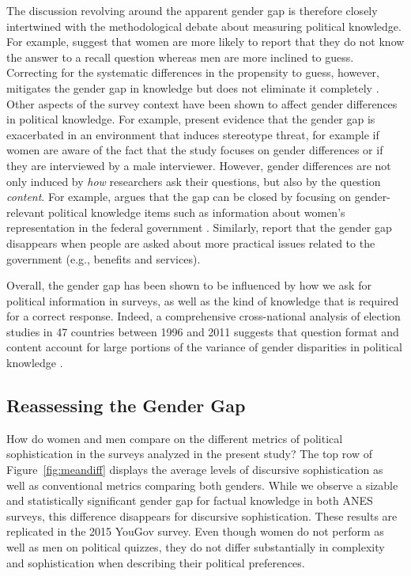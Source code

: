The discussion revolving around the apparent gender gap is therefore closely intertwined with the methodological debate about measuring political knowledge. For example, \citet{mondak2004knowledge} suggest that women are more likely to report that they do not know the answer to a recall question whereas men are more inclined to guess. Correcting for the systematic differences in the propensity to guess, however, mitigates the gender gap in knowledge but does not eliminate it completely \citep[see also][]{lizotte2009explaining}. Other aspects of the survey context have been shown to affect gender differences in political knowledge. For example, \citet{mcglone2006stereotype} present evidence that the gender gap is exacerbated in an environment that induces stereotype threat, for example if women are aware of the fact that the study focuses on gender differences or if they are interviewed by a male interviewer. However, gender differences are not only induced by \textit{how} researchers ask their questions, but also by the question \textit{content}. For example, \citet{dolan2011women} argues that the gap can be closed by focusing on gender-relevant political knowledge items such as information about women's representation in the federal government \citep[see also][]{graber2001processing,fraile2014does,jerit2017revisiting}. Similarly, \citet{stolle2010women} report that the gender gap disappears when people are asked about more practical issues related to the government (e.g., benefits and services).

Overall, the gender gap has been shown to be influenced by how we ask for political information in surveys, as well as the kind of knowledge that is required for a correct response. Indeed, a comprehensive cross-national analysis of election studies in 47 countries between 1996 and 2011 suggests that question format and content account for large portions of the variance of gender disparities in political knowledge \citep{fortin2016cross}.


\subsection*{Reassessing the Gender Gap}
How do women and men compare on the different metrics of political sophistication in the surveys analyzed in the present study? The top row of Figure~\ref{fig:meandiff} displays the average levels of discursive sophistication as well as conventional metrics comparing both genders. While we observe a sizable and statistically significant gender gap for factual knowledge in both ANES surveys, this difference disappears for discursive sophistication. These results are replicated in the 2015 YouGov survey. Even though women do not perform as well as men on political quizzes, they do not differ substantially in complexity and sophistication when describing their political preferences.

